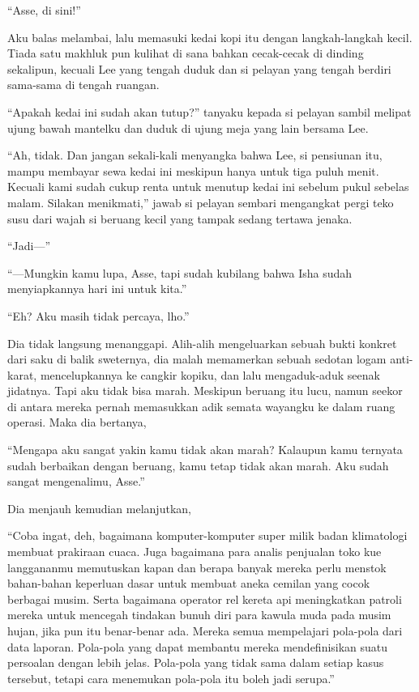 \documentclass[smalldemyvopaper,11pt,twoside,onecolumn,openright,extrafontsizes]{memoir}
\begin{document}
``Asse, di sini!''

Aku balas melambai, lalu memasuki kedai kopi itu dengan langkah-langkah kecil. Tiada satu makhluk pun kulihat di sana bahkan cecak-cecak di dinding sekalipun, kecuali Lee yang tengah duduk dan si pelayan yang tengah berdiri sama-sama di tengah ruangan.


``Apakah kedai ini sudah akan tutup?'' tanyaku kepada si pelayan sambil melipat ujung bawah mantelku dan duduk di ujung meja yang lain bersama Lee.

``Ah, tidak. Dan jangan sekali-kali menyangka bahwa Lee, si pensiunan itu, mampu membayar sewa kedai ini meskipun hanya untuk tiga puluh menit. Kecuali kami sudah cukup renta untuk menutup kedai ini sebelum pukul sebelas malam. Silakan menikmati,'' jawab si pelayan sembari mengangkat pergi teko susu dari wajah si beruang kecil yang tampak sedang tertawa jenaka.

``Jadi---''

``---Mungkin kamu lupa, Asse, tapi sudah kubilang bahwa Isha sudah menyiapkannya hari ini untuk kita.''

``Eh? Aku masih tidak percaya, lho.''


Dia tidak langsung menanggapi. Alih-alih mengeluarkan sebuah bukti konkret dari saku di balik sweternya, dia malah memamerkan sebuah sedotan logam anti-karat, mencelupkannya ke cangkir kopiku, dan lalu mengaduk-aduk seenak jidatnya. Tapi aku tidak bisa marah. Meskipun beruang itu lucu, namun seekor di antara mereka pernah memasukkan adik semata wayangku ke dalam ruang operasi. Maka dia bertanya,

``Mengapa aku sangat yakin kamu tidak akan marah? Kalaupun kamu ternyata sudah berbaikan dengan beruang, kamu tetap tidak akan marah. Aku sudah sangat mengenalimu, Asse.''

Dia menjauh kemudian melanjutkan,


``Coba ingat, deh, bagaimana komputer-komputer super milik badan klimatologi membuat prakiraan cuaca. Juga bagaimana para analis penjualan toko kue langgananmu memutuskan kapan dan berapa banyak mereka perlu menstok bahan-bahan keperluan dasar untuk membuat aneka cemilan yang cocok berbagai musim. Serta bagaimana operator rel kereta api meningkatkan patroli mereka untuk mencegah tindakan bunuh diri para kawula muda pada musim hujan, jika pun itu benar-benar ada. Mereka semua mempelajari pola-pola dari data laporan. Pola-pola yang dapat membantu mereka mendefinisikan suatu persoalan dengan lebih jelas. Pola-pola yang tidak sama dalam setiap kasus tersebut, tetapi cara menemukan pola-pola itu boleh jadi serupa.''
\end{document}
